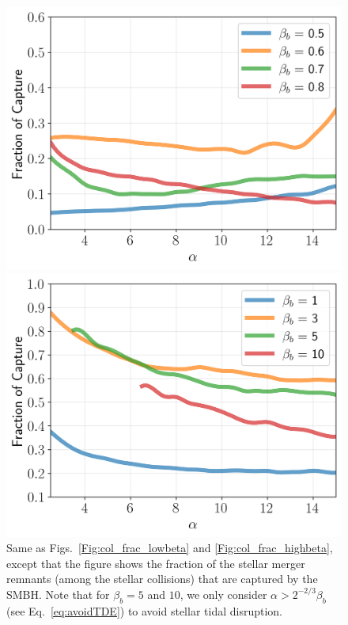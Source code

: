 \documentclass[twocolumn]{aastex631}
\begin{document}
\begin{figure}[htbp]
        \subfigure
        {
            \begin{minipage}[b]{0.95\linewidth} 
                \centering
                \includegraphics[width=\columnwidth]{figures/bound_fraction_lowbeta.png}
            \end{minipage}
        }
        \subfigure
        {
            \begin{minipage}[b]{0.95\linewidth}
                \centering
                \includegraphics[width=\columnwidth]{figures/bound_fraction_largebeta.png}
            \end{minipage}
        }
        \caption{
        Same as Figs.~\ref{Fig:col_frac_lowbeta} and \ref{Fig:col_frac_highbeta}, except that the figure shows the fraction of the stellar merger remnants (among the stellar collisions) that are captured by the SMBH.
        Note that for $\beta_b = 5$ and $10$, we only consider $\alpha > 2^{-2/3}\beta_b$ (see Eq.~\ref{eq:avoidTDE}) to avoid stellar tidal disruption.}
        \label{Fig:capture_fraction}
\end{figure}
\end{document}
